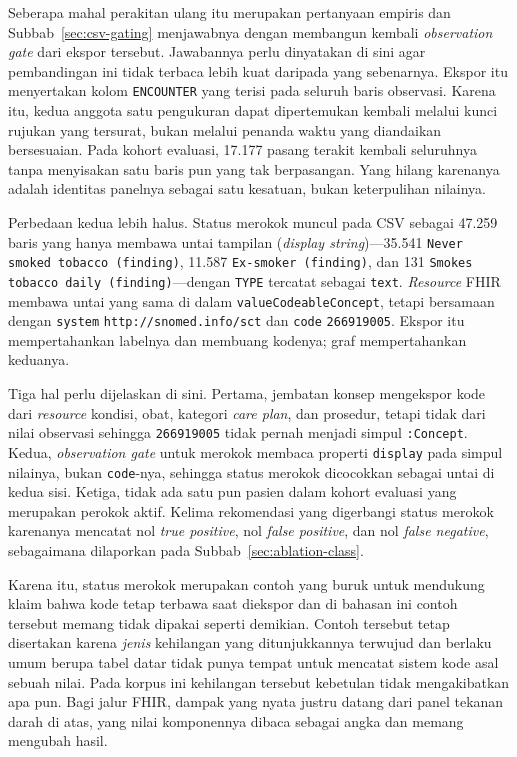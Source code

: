 Seberapa mahal perakitan ulang itu merupakan pertanyaan empiris dan Subbab~\ref{sec:csv-gating}
menjawabnya dengan membangun kembali \emph{observation gate} dari ekspor tersebut. Jawabannya perlu dinyatakan di sini agar pembandingan ini tidak terbaca lebih kuat daripada
yang sebenarnya. Ekspor itu menyertakan kolom \texttt{ENCOUNTER} yang terisi pada seluruh
baris observasi. Karena itu, kedua anggota satu pengukuran dapat dipertemukan kembali
melalui kunci rujukan yang tersurat, bukan melalui penanda waktu yang diandaikan
bersesuaian. Pada kohort
evaluasi, 17.177 pasang terakit kembali seluruhnya tanpa menyisakan satu baris pun yang tak
berpasangan. Yang hilang karenanya adalah identitas panelnya sebagai satu kesatuan, bukan
keterpulihan nilainya.

Perbedaan kedua lebih halus. Status
merokok muncul pada CSV sebagai 47.259 baris yang hanya membawa untai
tampilan (\emph{display string})---35.541 \texttt{Never smoked tobacco (finding)}, 11.587
\texttt{Ex-smoker (finding)}, dan 131 \texttt{Smokes tobacco daily
(finding)}---dengan \texttt{TYPE} tercatat sebagai \texttt{text}. \emph{Resource} FHIR membawa
untai yang sama di dalam \texttt{valueCodeableConcept}, tetapi bersamaan dengan \texttt{system}
\texttt{http://snomed.info/sct} dan \texttt{code} \texttt{266919005}. Ekspor itu mempertahankan
labelnya dan membuang kodenya; graf mempertahankan keduanya.

Tiga hal perlu dijelaskan di sini. Pertama, jembatan konsep mengekspor kode dari \emph{resource}
kondisi, obat, kategori \emph{care plan}, dan prosedur, tetapi tidak dari nilai observasi
sehingga \texttt{266919005} tidak pernah menjadi simpul \texttt{:Concept}. Kedua, \emph{observation gate} untuk merokok membaca properti \texttt{display} pada simpul
nilainya, bukan \texttt{code}-nya, sehingga status merokok dicocokkan sebagai untai di kedua
sisi. Ketiga, tidak ada satu pun pasien dalam kohort evaluasi yang merupakan perokok aktif.
Kelima rekomendasi yang digerbangi status merokok karenanya mencatat nol \emph{true
positive}, nol \emph{false positive}, dan nol \emph{false negative}, sebagaimana dilaporkan
pada Subbab~\ref{sec:ablation-class}.

Karena itu, status merokok merupakan contoh yang buruk untuk mendukung klaim bahwa kode tetap
terbawa saat diekspor dan di bahasan ini contoh tersebut memang tidak dipakai seperti demikian. Contoh tersebut tetap
disertakan karena \emph{jenis} kehilangan yang ditunjukkannya terwujud dan berlaku umum berupa tabel datar
tidak punya tempat untuk mencatat sistem kode asal sebuah nilai. Pada korpus ini kehilangan
tersebut kebetulan tidak mengakibatkan apa pun. Bagi jalur FHIR, dampak yang nyata justru datang dari panel tekanan darah di atas, yang nilai komponennya dibaca sebagai
angka dan memang mengubah hasil.

